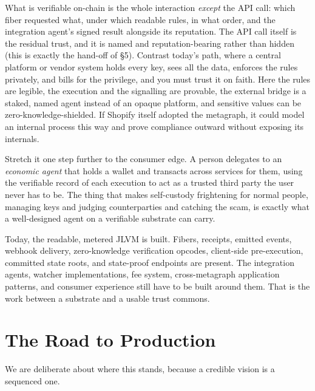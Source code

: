\documentclass[11pt,a4paper]{article}
\begin{document}
What is verifiable on-chain is the whole interaction \emph{except} the API call: which fiber requested what, under which readable rules, in what order, and the integration agent's signed result alongside its reputation. The API call itself is the residual trust, and it is named and reputation-bearing rather than hidden (this is exactly the hand-off of \S5). Contrast today's path, where a central platform or vendor system holds every key, sees all the data, enforces the rules privately, and bills for the privilege, and you must trust it on faith. Here the rules are legible, the execution and the signalling are provable, the external bridge is a staked, named agent instead of an opaque platform, and sensitive values can be zero-knowledge-shielded. If Shopify itself adopted the metagraph, it could model an internal process this way and prove compliance outward without exposing its internals.

Stretch it one step further to the consumer edge. A person delegates to an \emph{economic agent} that holds a wallet and transacts across services for them, using the verifiable record of each execution to act as a trusted third party the user never has to be. The thing that makes self-custody frightening for normal people, managing keys and judging counterparties and catching the scam, is exactly what a well-designed agent on a verifiable substrate can carry.

Today, the readable, metered JLVM is built. Fibers, receipts, emitted events, webhook delivery, zero-knowledge verification opcodes, client-side pre-execution, committed state roots, and state-proof endpoints are present. The integration agents, watcher implementations, fee system, cross-metagraph application patterns, and consumer experience still have to be built around them. That is the work between a substrate and a usable trust commons.

\section{The Road to Production}

We are deliberate about where this stands, because a credible vision is a sequenced one.
\end{document}
